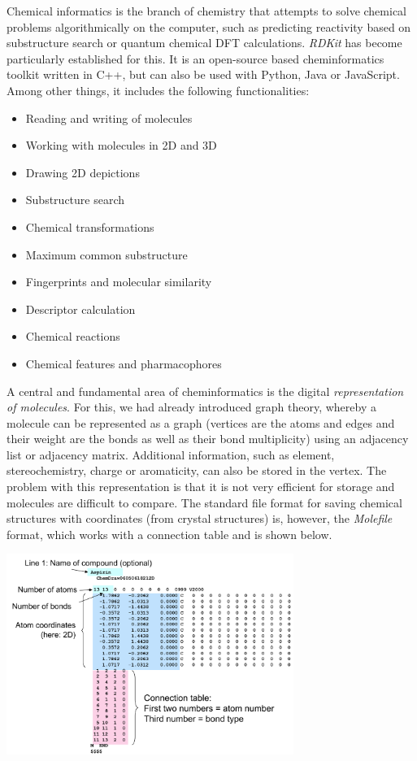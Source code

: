 
Chemical informatics is the branch of chemistry that attempts to solve chemical problems algorithmically on the computer, such as predicting reactivity based on substructure search or quantum chemical DFT calculations. \emph{RDKit} has become particularly established for this. It is an open-source based cheminformatics toolkit written in C++, but can also be used with Python, Java or JavaScript. Among other things, it includes the following functionalities:

\begin{itemize}
    \item Reading and writing of molecules
    \item Working with molecules in 2D and 3D
    \item Drawing 2D depictions
    \item Substructure search
    \item Chemical transformations
    \item Maximum common substructure
    \item Fingerprints and molecular similarity
    \item Descriptor calculation
    \item Chemical reactions
    \item Chemical features and pharmacophores
\end{itemize}

A central and fundamental area of cheminformatics is the digital \emph{representation of molecules}. For this, we had already introduced graph theory, whereby a molecule can be represented as a graph (vertices are the atoms and edges and their weight are the bonds as well as their bond multiplicity) using an adjacency list or adjacency matrix. Additional information, such as element, stereochemistry, charge or aromaticity, can also be stored in the vertex. The problem with this representation is that it is not very efficient for storage and molecules are difficult to compare. The standard file format for saving chemical structures with coordinates (from crystal structures) is, however, the \emph{Molefile} format, which works with a connection table and is shown below.

\begin{center}\includegraphics[width=0.70\textwidth]{img/cheminformatics/DataFormat.png}\end{center}


